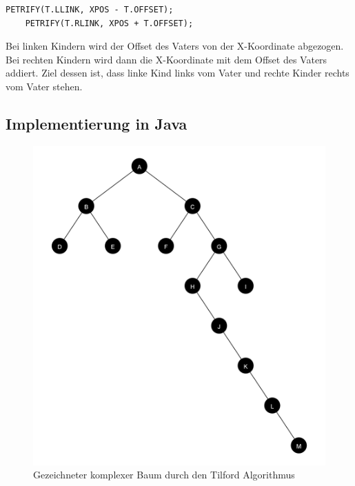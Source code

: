 \begin{lstlisting}[caption=Rekursiver Aufruf von Petrify (Pre-Order)]
    PETRIFY(T.LLINK, XPOS - T.OFFSET);
    PETRIFY(T.RLINK, XPOS + T.OFFSET);
\end{lstlisting}

Bei linken Kindern wird der Offset des Vaters von der X-Koordinate abgezogen. Bei rechten Kindern wird dann die X-Koordinate mit dem 
Offset des Vaters addiert. Ziel dessen ist, dass linke Kind links vom Vater und rechte Kinder rechts vom Vater stehen.


\subsection{Implementierung in Java}

\begin{figure}[H]
    \centering
    \includegraphics[scale = 0.05]{abbildungen/baum_algo_3_n1}
    \caption{Gezeichneter komplexer Baum durch den Tilford Algorithmus}
    \label{pic:baum_algo_3_n1} 
\end{figure}

